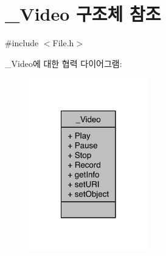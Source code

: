 \hypertarget{struct___video}{\section{\-\_\-\-Video 구조체 참조}
\label{struct___video}
}


{\ttfamily \#include $<$File.\-h$>$}



\-\_\-\-Video에 대한 협력 다이어그램\-:\nopagebreak
\begin{figure}[H]
\begin{center}
\leavevmode
\includegraphics[width=146pt]{dd/d0b/struct___video__coll__graph}
\end{center}
\end{figure}
